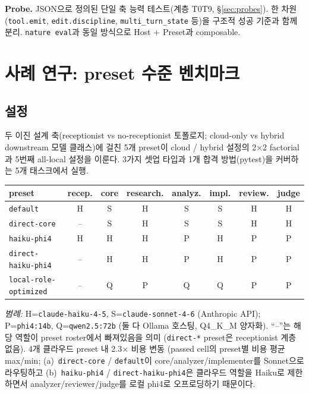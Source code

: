\documentclass[11pt,a4paper]{article}
\begin{document}
\textbf{Probe.} JSON으로 정의된 단일 축 능력 테스트(계층 T0\textendash T9,
\S\ref{sec:probes}). 한 차원(\texttt{tool.emit},
\texttt{edit.discipline}, \texttt{multi\_turn\_state} 등)을 구조적 성공
기준과 함께 분리. \texttt{nature eval}과 동일 방식으로 Host + Preset과
composable.

\section{사례 연구: preset 수준 벤치마크}
\label{sec:preset-benchmark}

\subsection{설정}

두 이진 설계 축(receptionist vs no-receptionist 토폴로지; cloud-only vs
hybrid downstream 모델 클래스)에 걸친 5개 preset이 cloud / hybrid 설정의
2$\times$2 factorial과 5번째 all-local 설정을 이룬다. 3가지 셋업 타입과
1개 합격 방법(pytest)을 커버하는 5개 태스크에서 실행.

\begin{table}[H]
\centering\small
\begin{tabular}{l c c c c c c c}
\toprule
preset & recep. & core & research. & analyz. & impl. & review. & judge \\
\midrule
\texttt{default}              & H & S & H & S & S & H & H \\
\texttt{direct-core}          & -- & S & H & S & S & H & H \\
\texttt{haiku-phi4}           & H & H & H & P & H & P & P \\
\texttt{direct-haiku-phi4}    & -- & H & H & P & H & P & P \\
\texttt{local-role-optimized} & -- & Q & P & Q & Q & P & P \\
\bottomrule
\end{tabular}
\end{table}

\textit{범례:} H=\texttt{claude-haiku-4-5}, S=\texttt{claude-sonnet-4-6}
(Anthropic API); P=\texttt{phi4:14b}, Q=\texttt{qwen2.5:72b}
(둘 다 Ollama 호스팅, Q4\_K\_M 양자화). ``--''는 해당 역할이 preset
roster에서 빠져있음을 의미 (\texttt{direct-*} preset은 receptionist
계층 없음). 4개 클라우드 preset 내 2.3$\times$ 비용 변동 (passed cell의 preset별 비용 평균 max/min;
(a)~\texttt{direct-core} / \texttt{default}이 core/analyzer/implementer를
Sonnet으로 라우팅하고 (b)~\texttt{haiku-phi4} /
\texttt{direct-haiku-phi4}은 클라우드 역할을 Haiku로 제한하면서
analyzer/reviewer/judge를 로컬 phi4로 오프로딩하기 때문이다.
\end{document}
